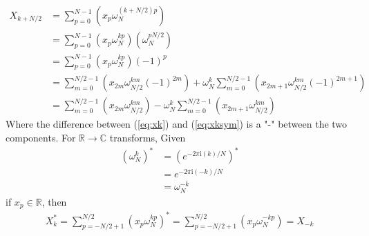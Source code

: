 \documentclass{article}
\begin{document}
\begin {equation} \label {eq:xksym}
\begin {aligned}
X_{k + N/2} &= \sum_{p = 0}^{N-1} (x_p \omega_N^{(k + N/2) p}) \\
            &= \sum_{p = 0}^{N-1} (x_p \omega_N^{k p}) (\omega_N^{p N/2}) \\
            &= \sum_{p = 0}^{N-1} (x_p \omega_N^{k p}) (-1)^p \\
            &= \sum_{m = 0}^{N/2-1} (x_{2m} \omega_{N/2}^{k m} (-1)^{2m}) + \omega_N^{k} \sum_{m = 0}^{N/2-1} (x_{2m+1} \omega_{N/2}^{km} (-1)^{2m+1}) \\
            &= \sum_{m = 0}^{N/2-1} (x_{2m} \omega_{N/2}^{k m}) - \omega_N^{k} \sum_{m = 0}^{N/2-1} (x_{2m+1} \omega_{N/2}^{km})
%
\end {aligned}
\end {equation}
%
Where the difference between (\ref{eq:xk}) and (\ref{eq:xksym}) is a "-" between the two components.
%
\vfill
%
For $\mathbb {R} \rightarrow \mathbb {C}$ transforms, Given
%
\begin {equation}
\begin {aligned}
\left (\omega_N^{k} \right)^* &= \left (e^{-2 \pi \mathrm {i} (k) / N} \right)^* \\
                              &= e^{-2 \pi \mathrm {i} (-k) / N} \\
                              &= \omega_{N}^{-k}
\end {aligned}
\end {equation}
%
if $x_p \in \mathbb {R}$, then
\begin {equation}
\begin {aligned}
X_k^* = \sum_{p = -N/2+1}^{N/2} (x_p \omega_N^{k p})^*
      = \sum_{p = -N/2+1}^{N/2} (x_p \omega_N^{-k p})
      = X_{-k}
\end {aligned}
\end {equation}
%
\end{document}
